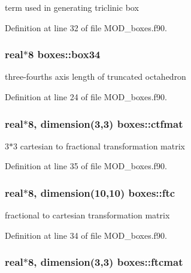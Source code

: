 term used in generating triclinic box 



Definition at line 32 of file M\-O\-D\-\_\-boxes.\-f90.

\hypertarget{classboxes_a397afd9820df0a90accac5cb22327e0d}{
\subsubsection[{box34}]{\setlength{\rightskip}{0pt plus 5cm}real$\ast$8 boxes\-::box34}}\label{classboxes_a397afd9820df0a90accac5cb22327e0d}


three-\/fourths axis length of truncated octahedron 



Definition at line 24 of file M\-O\-D\-\_\-boxes.\-f90.

\hypertarget{classboxes_a653e24c554b7b1a243c964602dabfb56}{
\subsubsection[{ctfmat}]{\setlength{\rightskip}{0pt plus 5cm}real$\ast$8, dimension(3,3) boxes\-::ctfmat}}\label{classboxes_a653e24c554b7b1a243c964602dabfb56}


3$\ast$3 cartesian to fractional transformation matrix 



Definition at line 35 of file M\-O\-D\-\_\-boxes.\-f90.

\hypertarget{classboxes_af71918207c18b840f87869b1c5b465ad}{
\subsubsection[{ftc}]{\setlength{\rightskip}{0pt plus 5cm}real$\ast$8, dimension(10,10) boxes\-::ftc}}\label{classboxes_af71918207c18b840f87869b1c5b465ad}


fractional to cartesian transformation matrix 



Definition at line 34 of file M\-O\-D\-\_\-boxes.\-f90.

\hypertarget{classboxes_a3e2991c39a7c6f6578cdf7a5ee49d1c4}{
\subsubsection[{ftcmat}]{\setlength{\rightskip}{0pt plus 5cm}real$\ast$8, dimension(3,3) boxes\-::ftcmat}}\label{classboxes_a3e2991c39a7c6f6578cdf7a5ee49d1c4}


